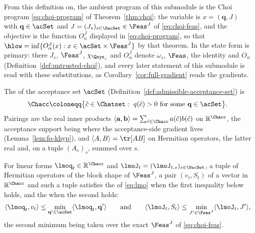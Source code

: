 \begin{definition}\label{def:first-order-setting}
From this definition on, the ambient program of this submodule is the
Choi program \eqref{eq:choi-program} of Theorem~\ref{thm:choi}: the
variable is $x=(\mathbf q,J)$ with $\mathbf q\in\acSet$ and
$J=(J_s)_{s\in\SecSet}\in\Feas^{J}$ of \eqref{eq:choi-feas}, and the
objective is the function $O^{J}_{\alpha}$ displayed in
\eqref{eq:choi-program}, so that
$\hlow=\inf\{O^{J}_{\alpha}(x):x\in\acSet\times\Feas^{J}\}$ by that
theorem. In  the state form is primary: there
$J_s$, $\Feas^{J}$, $\chi_{\Qsys_s}$ and $O^{J}_{\alpha}$ denote $\omega_s$,
$\Feas$, the identity and $O_{\alpha}$
(Definition~\ref{def:untrusted-choi}), and every later statement of this
submodule is read with these substitutions, as
Corollary~\ref{cor:full-gradient} reads the gradients.

The
of the acceptance set $\acSet$ (Definition~\ref{def:admissible-acceptance-set}) is
\begin{equation}\label{eq:chacc-def}
  \Chacc\coloneqq\big\{\hat c\in\Chatset:\ q(\hat c)>0
  \ \text{for some }\mathbf q\in\acSet\big\}.
\end{equation}
Pairings are the real inner products
$\langle\mathbf a,\mathbf b\rangle=
\sum_{\hat c\in\Chacc}a(\hat c)b(\hat c)$ on $\mathbb{R}^{\Chacc}$, the
acceptance support being where the acceptance-side gradient lives
(Lemma~\ref{lem:fo-khyp}), and
$\langle A,B\rangle=\tr[A B]$ on Hermitian operators, the latter real and,
on a tuple $(A_s)_s$, summed over $s$.

For linear forms $\lmoq_t\in\mathbb{R}^{\Chacc}$ and
$\lmoJ_t=(\lmoJ_{t,s})_{s\in\SecSet}$, a tuple of Hermitian operators of the
block shape of $\Feas^{J}$, a pair $(v_t,S_t)$ of a vector in
$\mathbb{R}^{\Chacc}$ and such a tuple satisfies the
of \eqref{eq:lmo} when the first inequality below holds, and the
when the second holds:
\begin{equation}\label{eq:lmo}
  \langle\lmoq_t,v_t\rangle\le
  \min_{\mathbf q'\in\acSet}\langle\lmoq_t,\mathbf q'\rangle
  \qquad\text{and}\qquad
  \langle\lmoJ_t,S_t\rangle\le
  \min_{J'\in\Feas^{J}}\langle\lmoJ_t,J'\rangle ,
\end{equation}
the second minimum being taken over the exact $\Feas^{J}$ of
\eqref{eq:choi-feas}.
\end{definition}
